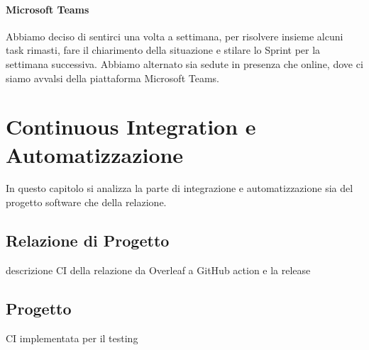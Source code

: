     \paragraph{Microsoft Teams}
    Abbiamo deciso di sentirci una volta a settimana, per risolvere insieme alcuni task rimasti, fare il chiarimento della situazione e stilare lo Sprint per la settimana successiva. Abbiamo alternato sia sedute in presenza che online, dove ci siamo avvalsi della piattaforma Microsoft Teams.
    
     

\section{Continuous Integration e Automatizzazione}
\label{chap:CI}
In questo capitolo si analizza la parte di integrazione e automatizzazione sia del progetto software che della relazione. 
    \subsection{Relazione di Progetto}
        descrizione CI della relazione da Overleaf a GitHub action e la release

    \subsection{Progetto}
        CI implementata per il testing 
        
        





